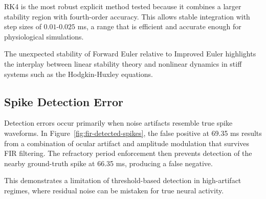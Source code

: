     RK4 is the most robust explicit method tested because it combines a larger stability region with fourth-order accuracy.  
    This allows stable integration with step sizes of $0.01$-$0.025$ ms, a range that is efficient and accurate enough for physiological simulations.
    
    The unexpected stability of Forward Euler relative to Improved Euler highlights the interplay between linear stability theory and nonlinear dynamics in stiff systems such as the Hodgkin-Huxley equations.

\subsection{Spike Detection Error}

    Detection errors occur primarily when noise artifacts resemble true spike waveforms.  
    In Figure~\ref{fig:fir-detected-spikes}, the false positive at 69.35 ms results from a combination of ocular artifact and amplitude modulation that survives FIR filtering.  
    The refractory period enforcement then prevents detection of the nearby ground-truth spike at 66.35 ms, producing a false negative.
    
    This demonstrates a limitation of threshold-based detection in high-artifact regimes, where residual noise can be mistaken for true neural activity.